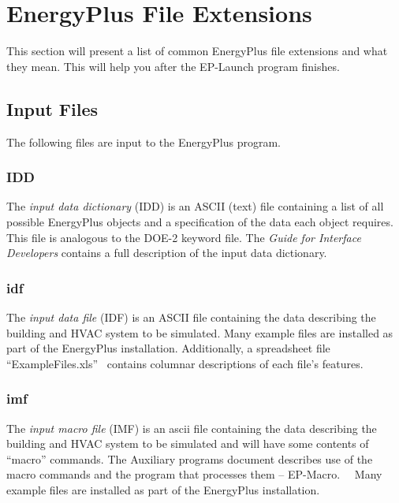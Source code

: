 \section{EnergyPlus File Extensions}\label{energyplus-file-extensions}

This section will present a list of common EnergyPlus file extensions and what they mean. This will help you after the EP-Launch program finishes.

\subsection{Input Files}\label{input-files}

The following files are input to the EnergyPlus program.

\subsubsection{IDD}\label{idd}

The \emph{input data dictionary} (IDD) is an ASCII (text) file containing a list of all possible EnergyPlus objects and a specification of the data each object requires. This file is analogous to the DOE-2 keyword file. The \emph{Guide for Interface Developers} contains a full description of the input data dictionary.

\subsubsection{idf}\label{idf}

The \emph{input data file} (IDF) is an ASCII file containing the data describing the building and HVAC system to be simulated. Many example files are installed as part of the EnergyPlus installation. Additionally, a spreadsheet file ``ExampleFiles.xls'' ~contains columnar descriptions of each file's features.

\subsubsection{imf}\label{imf}

The \emph{input macro file} (IMF) is an ascii file containing the data describing the building and HVAC system to be simulated and will have some contents of ``macro'' commands. The Auxiliary programs document describes use of the macro commands and the program that processes them -- EP-Macro. ~~Many example files are installed as part of the EnergyPlus installation.

